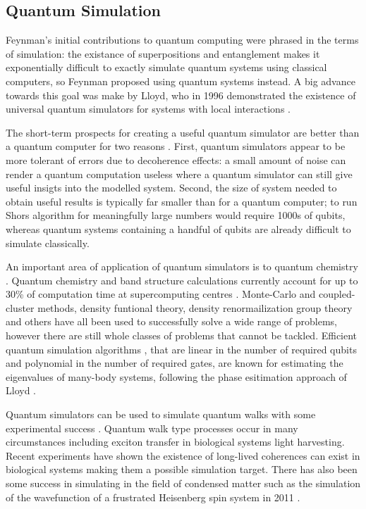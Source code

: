 \subsection{Quantum Simulation}

Feynman's initial contributions to quantum computing \cite{feynman_81} were phrased in the terms of simulation: the existance of superpositions and entanglement makes it exponentially difficult to exactly simulate quantum systems using classical computers, so Feynman proposed using quantum systems instead. A big advance towards this goal was make by Lloyd, who in 1996 demonstrated the existence of universal quantum simulators for systems with local interactions \cite{lloyd_universal_simulators}.

The short-term prospects for creating a useful quantum simulator are better than a quantum computer for two reasons \cite{simulation_ion_review}. First, quantum simulators appear to be more tolerant of errors due to decoherence effects: a small amount of noise can render a quantum computation useless where a quantum simulator can still give useful insigts into the modelled system. Second, the size of system needed to obtain useful results is typically far smaller than for a quantum computer; to run Shors algorithm for meaningfully large numbers would require 1000s of qubits, whereas quantum systems containing a handful of qubits are already difficult to simulate classically.

An important area of application of quantum simulators is to quantum chemistry \cite{science_quantum_simulator_review_09}. Quantum chemistry and band structure calculations currently account for up to 30\% of computation time at supercomputing centres \cite{simulation_photon_review, supercomputer_report_10}. Monte-Carlo and coupled-cluster methods, density funtional theory, density renormailization group theory and others have all been used to successfully solve a wide range of problems, however there are still whole classes of problems that cannot be tackled. Efficient quantum simulation algorithms \cite{quantum_chem_alg_05, simulation_hamiltonians_11}, that are linear in the number of required qubits and polynomial in the number of required gates, are known for estimating the eigenvalues of many-body systems, following the phase esitimation approach of Lloyd \cite{lloyd_simulate_eigenvalues_99, lloyd_simulate_many_body_97}.

Quantum simulators can be used to simulate quantum walks \cite{farhi_quantum_walks_98} with some experimental success \cite{quantum_walks_simulated_08}. Quantum walk type processes occur in many circumstances including exciton transfer in biological systems light harvesting. Recent experiments have shown the existence of long-lived coherences can exist in biological systems \cite{quant_bio_coherences_1, quant_bio_coherences_2, quant_bio_coherences_3} making them a possible simulation target. There has also been some success in simulating in the field of condensed matter such as the simulation of the wavefunction of a frustrated Heisenberg spin system in 2011 \cite{simulation_frustrated_spins_11}.

